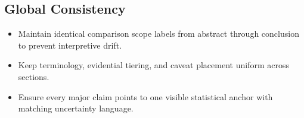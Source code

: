 \documentclass[11pt]{article}
\begin{document}
\subsection*{Global Consistency}
\begin{itemize}
\item Maintain identical comparison scope labels from abstract through conclusion to prevent interpretive drift.
\item Keep terminology, evidential tiering, and caveat placement uniform across sections.
\item Ensure every major claim points to one visible statistical anchor with matching uncertainty language.
\end{itemize}
\end{document}
